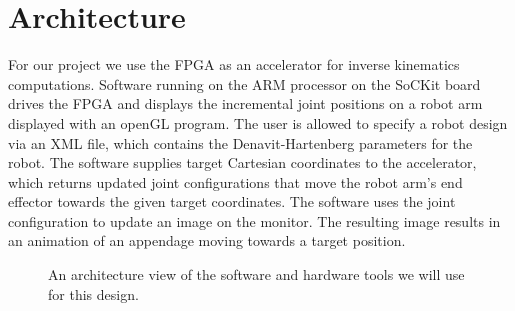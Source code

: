 \section{Architecture}
For our project we use the FPGA as an accelerator for
inverse kinematics computations. Software running on the ARM processor 
on the SoCKit board drives the FPGA and displays the incremental joint 
positions on a robot arm displayed with an openGL program.
The user is allowed to specify a robot design via an XML file, 
which contains the Denavit-Hartenberg parameters for the robot. 
The software supplies target Cartesian coordinates 
to the accelerator, which returns updated joint configurations that
move the robot arm's end effector towards the given target coordinates. 
The software uses the 
joint configuration to update an image on the monitor. The resulting 
image results in an animation of an appendage moving towards a target 
position.

\begin{figure}[ht]
\center
{}
\caption{An architecture view of the software and hardware tools we will use for this design.}
\label{fig:toolchain}
\end{figure}
